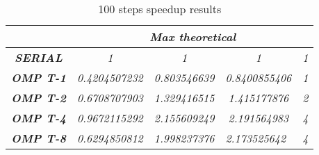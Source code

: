\begin{table}
    \centering
    \begin{tabular}{|c|c|c|c|c|} 
    \hline
                                                    & \multicolumn{4}{c|}{\textit{\textbf{Max theoretical}}}                                                                                                                \\ 
    \hline
    \textit{\textbf{SERIAL}}                        & \textit{1}                                 & \textit{1}                                & \textit{1}                                & \textit{1}                       \\ 
    \hline
    \textit{\textbf{OMP T-1}}                       & \textit{0.4204507232}                      & \textit{0.803546639}                      & \textit{0.8400855406}                     & \textit{1}                       \\ 
    \hline
    \textit{\textbf{OMP T-2}}                       & \textit{0.6708707903}                      & \textit{1.329416515}                      & \textit{1.415177876}                      & \textit{2}                       \\ 
    \hline
    \textit{\textbf{OMP T-4}}                       & \textit{0.9672115292}                      & \textit{2.155609249}                      & \textit{2.191564983}                      & \textit{4}                       \\ 
    \hline
    \multicolumn{1}{|l|}{\textit{\textbf{OMP T-8}}} & \multicolumn{1}{l|}{\textit{0.6294850812}} & \multicolumn{1}{l|}{\textit{1.998237376}} & \multicolumn{1}{l|}{\textit{2.173525642}} & \multicolumn{1}{l|}{\textit{4}}  \\
    \hline
    \end{tabular}
    \caption{100 steps speedup results}
    \end{table}